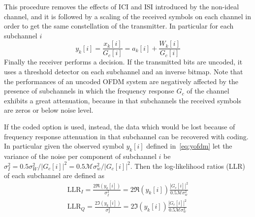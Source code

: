 \documentclass[10pt]{article}
\newcommand{\ofdM} {\mathcal{M}}
\begin{document}
This procedure removes the effects of ICI and ISI introduced by the non-ideal channel, and it is followed by a scaling of the received symbols on each channel in order to get the same constellation of the transmitter. In particular for each subchannel $i$ 
\begin{equation}
	y_k[i] = \frac{x_k[i]}{G_c[i]} = a_k[i] + \frac{W_k[i]}{G_c[i]}
	\label{eq:yofdm}
\end{equation}
Finally the receiver performs a decision. If the transmitted bits are uncoded, it uses a threshold detector on each subchannel and an inverse bitmap. Note that the performances of an uncoded OFDM system are negatively affected by the presence of subchannels in which the frequency response $G_c$ of the channel exhibits a great attenuation, because in that subchannels the received symbols are zeros or below noise level. 

If the coded option is used, instead, the data which would be lost because of frequency response attenuation in that subchannel can be recovered with coding. In particular given the observed symbol $y_k[i]$ defined in~\eqref{eq:yofdm} let the variance of the noise per component of subchannel $i$ be $\sigma_I^2 = 0.5 \sigma_W^2/|G_c[i]|^2 = 0.5 \ofdM \sigma_w^2/|G_c[i]|^2$. Then the log-likelihood ratios (LLR) of each subchannel are defined as
\begin{eqnarray}
	\mathrm{LLR}_I = \frac{2\Re(y_k[i])}{\sigma_I^2} = 2\Re(y_k[i]) \frac{|G_c[i]|^2 }{0.5 \ofdM \sigma_w^2} \\
	\mathrm{LLR}_Q = \frac{2\Im(y_k[i])}{\sigma_I^2} = 2\Im(y_k[i]) \frac{|G_c[i]|^2 }{0.5 \ofdM \sigma_w^2} \\
\end{eqnarray}
\end{document}
